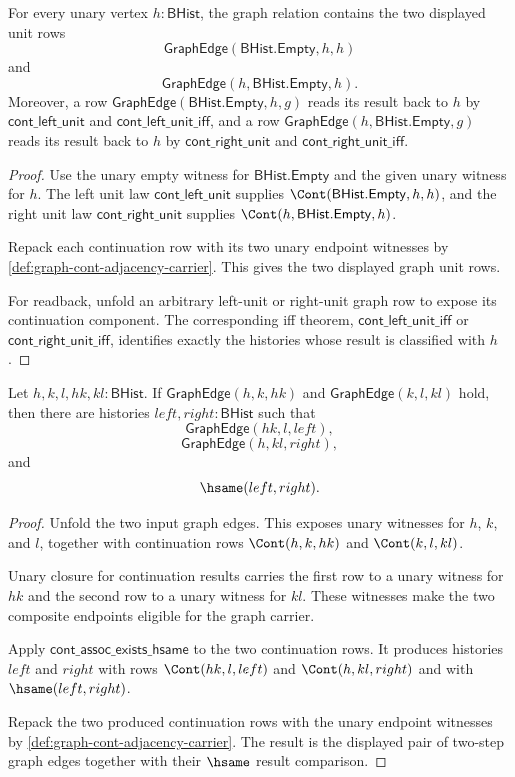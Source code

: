 \begin{theorem}
\label{thm:graph-cont-unit-loop}
For every unary vertex $h:\mathsf{BHist}$, the graph relation contains the two
displayed unit rows
$$
\mathsf{GraphEdge}(\mathsf{BHist.Empty},h,h)
$$
and
$$
\mathsf{GraphEdge}(h,\mathsf{BHist.Empty},h).
$$
Moreover, a row $\mathsf{GraphEdge}(\mathsf{BHist.Empty},h,g)$ reads its
result back to $h$ by $\mathsf{cont\_left\_unit}$ and
$\mathsf{cont\_left\_unit\_iff}$, and a row
$\mathsf{GraphEdge}(h,\mathsf{BHist.Empty},g)$ reads its result back to $h$ by
$\mathsf{cont\_right\_unit}$ and $\mathsf{cont\_right\_unit\_iff}$.
\end{theorem}
\begin{proof}
Use the unary empty witness for $\mathsf{BHist.Empty}$ and the given unary
witness for $h$. The left unit law $\mathsf{cont\_left\_unit}$ supplies
$\Cont(\mathsf{BHist.Empty},h,h)$, and the right unit law
$\mathsf{cont\_right\_unit}$ supplies $\Cont(h,\mathsf{BHist.Empty},h)$.

Repack each continuation row with its two unary endpoint witnesses by
\autoref{def:graph-cont-adjacency-carrier}. This gives the two displayed graph
unit rows.

For readback, unfold an arbitrary left-unit or right-unit graph row to expose
its continuation component. The corresponding iff theorem,
$\mathsf{cont\_left\_unit\_iff}$ or $\mathsf{cont\_right\_unit\_iff}$,
identifies exactly the histories whose result is classified with $h$.
\end{proof}

\begin{theorem}
\label{thm:graph-cont-two-step-composition}
Let $h,k,l,hk,kl:\mathsf{BHist}$. If
$\mathsf{GraphEdge}(h,k,hk)$ and $\mathsf{GraphEdge}(k,l,kl)$ hold, then there
are histories $left,right:\mathsf{BHist}$ such that
$$
\mathsf{GraphEdge}(hk,l,left),
$$
$$
\mathsf{GraphEdge}(h,kl,right),
$$
and
$$
\hsame(left,right).
$$
\end{theorem}
\begin{proof}
Unfold the two input graph edges. This exposes unary witnesses for $h$, $k$,
and $l$, together with continuation rows $\Cont(h,k,hk)$ and
$\Cont(k,l,kl)$.

Unary closure for continuation results carries the first row to a unary witness
for $hk$ and the second row to a unary witness for $kl$. These witnesses make
the two composite endpoints eligible for the graph carrier.

Apply $\mathsf{cont\_assoc\_exists\_hsame}$ to the two continuation rows. It
produces histories $left$ and $right$ with rows $\Cont(hk,l,left)$ and
$\Cont(h,kl,right)$ and with $\hsame(left,right)$.

Repack the two produced continuation rows with the unary endpoint witnesses by
\autoref{def:graph-cont-adjacency-carrier}. The result is the displayed pair of
two-step graph edges together with their $\hsame$ result comparison.
\end{proof}

